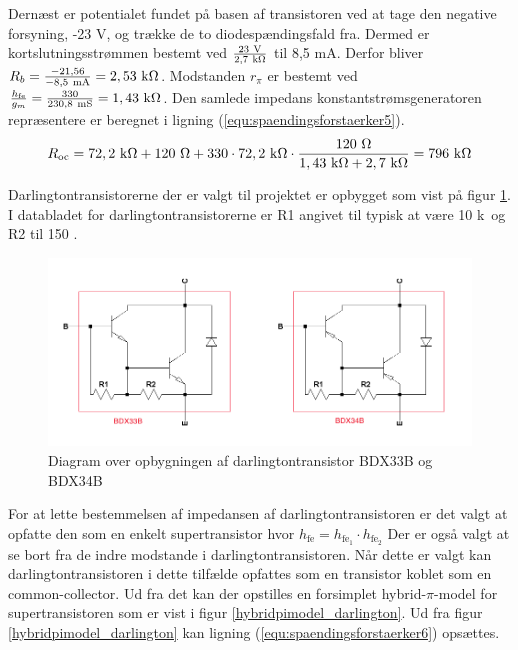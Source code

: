 Dernæst er potentialet fundet på basen af transistoren ved at tage den negative forsyning, -23 V, og trække de to diodespændingsfald fra. Dermed er kortslutningsstrømmen bestemt ved $\frac{23~\mathrm{V}}{2,7~\mathrm{k}\ohm}$ til 8,5 mA. Derfor bliver $R_b = \frac{-21,56}{-8,5~\mathrm{mA}} = 2,53~\mathrm{k}\ohm$. Modstanden $r_{\pi}$ er bestemt ved $\frac{h_{\mathrm{fe}}}{g_m} = \frac{330}{230,8~\mathrm{mS}} = 1,43~\mathrm{k}\ohm$. Den samlede impedans konstantstrømsgeneratoren repræsentere er beregnet i ligning (\ref{equ:spaendingsforstaerker5}). 
\begin{equation}
\label{equ:spaendingsforstaerker5}
R_{\mathrm{oc}} = 72,2~\mathrm{k}\ohm + 120~\ohm + 330 \cdot 72,2~\mathrm{k}\ohm \cdot \frac{120~\ohm}{1,43~\mathrm{k}\ohm + 2,7~\mathrm{k}\ohm} = 796~\mathrm{k}\ohm
\end{equation}


Darlingtontransistorerne der er valgt til projektet er opbygget som vist på figur \ref{darlington_diagram}. I databladet for darlingtontransistorerne \cite{bdx33-34-datablad} er R1 angivet til typisk at være 10 k\ohm~og R2 til 150 \ohm.

\begin{figure}[h]
\centering
\includegraphics[scale = 0.4]{teknisk/effektforstaerker/darlingtontransistor_opbygning.png}
\caption{Diagram over opbygningen af darlingtontransistor BDX33B og BDX34B}
\label{darlington_diagram}
\end{figure}

For at lette bestemmelsen af impedansen af darlingtontransistoren er det valgt at opfatte den som en enkelt supertransistor hvor $h_{\mathrm{fe}}= h_{\mathrm{fe}_1} \cdot h_{\mathrm{fe}_2}$ 
Der er også valgt at se bort fra de indre modstande i darlingtontransistoren. Når dette er valgt kan darlingtontransistoren i dette tilfælde opfattes som en transistor koblet som en common-collector. Ud fra det kan der opstilles en forsimplet hybrid-$\pi$-model for supertransistoren som er vist i figur \ref{hybridpimodel_darlington}. Ud fra figur \ref{hybridpimodel_darlington} kan ligning (\ref{equ:spaendingsforstaerker6}) opsættes.

